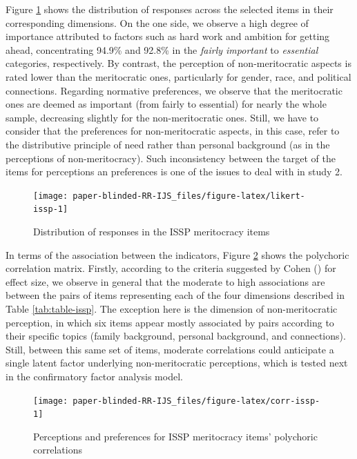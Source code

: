 \documentclass[
  10pt,
  a4paper,
]{article}
\begin{document}
Figure \ref{fig:likert-issp} shows the distribution of responses across the selected items in their corresponding dimensions. On the one side, we observe a high degree of importance attributed to factors such as hard work and ambition for getting ahead, concentrating 94.9\% and 92.8\% in the \emph{fairly important} to \emph{essential} categories, respectively. By contrast, the perception of non-meritocratic aspects is rated lower than the meritocratic ones, particularly for gender, race, and political connections. Regarding normative preferences, we observe that the meritocratic ones are deemed as important (from fairly to essential) for nearly the whole sample, decreasing slightly for the non-meritocratic ones. Still, we have to consider that the preferences for non-meritocratic aspects, in this case, refer to the distributive principle of need rather than personal background (as in the perceptions of non-meritocracy). Such inconsistency between the target of the items for perceptions an preferences is one of the issues to deal with in study 2.

\begin{figure}[H]

{\centering \texttt{[image: paper-blinded-RR-IJS\_files/figure-latex/likert-issp-1]} 

}

\caption{Distribution of responses in the ISSP meritocracy items}\label{fig:likert-issp}
\end{figure}

In terms of the association between the indicators, Figure \ref{fig:corr-issp} shows the polychoric correlation matrix. Firstly, according to the criteria suggested by Cohen () for effect size, we observe in general that the moderate to high associations are between the pairs of items representing each of the four dimensions described in Table \ref{tab:table-issp}. The exception here is the dimension of non-meritocratic perception, in which six items appear mostly associated by pairs according to their specific topics (family background, personal background, and connections). Still, between this same set of items, moderate correlations could anticipate a single latent factor underlying non-meritocratic perceptions, which is tested next in the confirmatory factor analysis model.

\begin{figure}[H]

{\centering \texttt{[image: paper-blinded-RR-IJS\_files/figure-latex/corr-issp-1]} 

}

\caption{Perceptions and preferences for ISSP  meritocracy items' polychoric correlations}\label{fig:corr-issp}
\end{figure}
\end{document}
